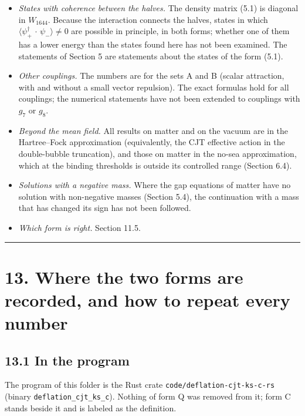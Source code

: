 \documentclass[
  10pt,
]{article}
\providecommand{\tightlist}{%
  \setlength{\itemsep}{0pt}\setlength{\parskip}{0pt}}
\begin{document}
\begin{itemize}
\tightlist
\item
  \emph{States with coherence between the halves.} The density matrix
  (5.1) is diagonal in \(W_{1644}\). Because the interaction connects
  the halves, states in which
  \(\langle\psi_+^\dagger\,\cdot\,\psi_-\rangle\neq0\) are possible in
  principle, in both forms; whether one of them has a lower energy than
  the states found here has not been examined. The statements of Section
  5 are statements about the states of the form (5.1).
\item
  \emph{Other couplings.} The numbers are for the sets A and B (scalar
  attraction, with and without a small vector repulsion). The exact
  formulas hold for all couplings; the numerical statements have not
  been extended to couplings with \(g_7\) or \(g_8\).
\item
  \emph{Beyond the mean field.} All results on matter and on the vacuum
  are in the Hartree--Fock approximation (equivalently, the CJT
  effective action in the double-bubble truncation), and those on matter
  in the no-sea approximation, which at the binding thresholds is
  outside its controlled range (Section 6.4).
\item
  \emph{Solutions with a negative mass.} Where the gap equations of
  matter have no solution with non-negative masses (Section 5.4), the
  continuation with a mass that has changed its sign has not been
  followed.
\item
  \emph{Which form is right.} Section 11.5.
\end{itemize}

\begin{center}\rule{0.5\linewidth}{0.5pt}\end{center}

\hypertarget{where-the-two-forms-are-recorded-and-how-to-repeat-every-number}{%
\section{13. Where the two forms are recorded, and how to repeat every
number}\label{where-the-two-forms-are-recorded-and-how-to-repeat-every-number}}

\hypertarget{in-the-program}{%
\subsection{13.1 In the program}\label{in-the-program}}

The program of this folder is the Rust crate
\texttt{code/deflation-cjt-ks-c-rs} (binary
\texttt{deflation\_cjt\_ks\_c}). Nothing of form Q was removed from it;
form C stands beside it and is labeled as the definition.
\end{document}
